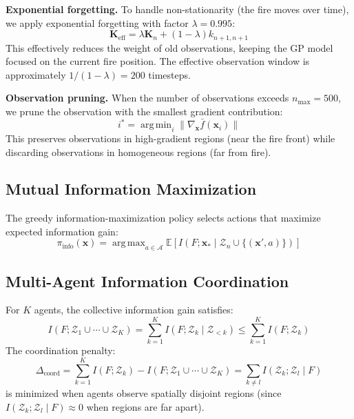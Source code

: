 \documentclass[12pt,a4paper]{article}
\DeclareRobustCommand{\cA}{\mathcal{A}}
\DeclareRobustCommand{\cZ}{\mathcal{Z}}
\DeclareRobustCommand{\E}{\mathbb{E}}
\DeclareRobustCommand{\vect}[1]{\bm{#1}}
\DeclareRobustCommand{\mat}[1]{\bm{#1}}
\DeclareMathOperator*{\argmin}{arg\,min}
\DeclareMathOperator*{\argmax}{arg\,max}
\begin{document}
\textbf{Exponential forgetting.} To handle non-stationarity (the fire moves over time), we apply exponential forgetting with factor $\lambda = 0.995$:
\begin{equation}
    \mat{K}_{\text{eff}} = \lambda \mat{K}_n + (1-\lambda) k_{n+1,n+1}
\end{equation}
This effectively reduces the weight of old observations, keeping the GP model focused on the current fire position. The effective observation window is approximately $1/(1-\lambda) = 200$ timesteps.

\textbf{Observation pruning.} When the number of observations exceeds $n_{\max} = 500$, we prune the observation with the smallest gradient contribution:
\begin{equation}
    i^* = \argmin_i \|\nabla_{\vect{x}} \bar{f}(\vect{x}_i)\|
\end{equation}
This preserves observations in high-gradient regions (near the fire front) while discarding observations in homogeneous regions (far from fire).

\subsection{Mutual Information Maximization}
The greedy information-maximization policy selects actions that maximize expected information gain:
\begin{equation}
    \pi_{\text{info}}(\vect{x}) = \argmax_{a \in \cA} \E\left[I(F; \vect{x}_* \mid \cZ_n \cup \{(\vect{x}', a)\})\right]
    \label{eq:info_policy}
\end{equation}

\subsection{Multi-Agent Information Coordination}
For $K$ agents, the collective information gain satisfies:
\begin{equation}
    I(F; \cZ_1 \cup \cdots \cup \cZ_K) = \sum_{k=1}^K I(F; \cZ_k \mid \cZ_{<k}) \leq \sum_{k=1}^K I(F; \cZ_k)
\end{equation}
The coordination penalty:
\begin{equation}
    \Delta_{\text{coord}} = \sum_{k=1}^K I(F; \cZ_k) - I(F; \cZ_1 \cup \cdots \cup \cZ_K) = \sum_{k \neq l} I(\cZ_k; \cZ_l \mid F)
\end{equation}
is minimized when agents observe spatially disjoint regions (since $I(\cZ_k; \cZ_l \mid F) \approx 0$ when regions are far apart).
\end{document}
